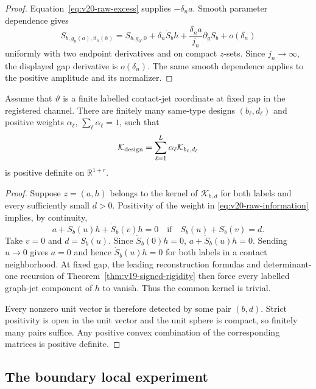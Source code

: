 \begin{proof}
Equation~\eqref{eq:v20-raw-excess} supplies $-\delta_na$.  Smooth parameter
dependence gives
\[
 S_{b,g_n(a),\vartheta_n(h)}
 =S_{b,g_0,0}+\delta_n\dot S_bh
 +\frac{\delta_na}{j_n}\partial_gS_b+o(\delta_n)
\]
uniformly with two endpoint derivatives and on compact $z$-sets.  Since
$j_n\to\infty$, the displayed gap derivative is $o(\delta_n)$.  The same
smooth dependence applies to the positive amplitude and its normalizer.
\end{proof}

\begin{lemma}
\label{lem:v20-finite-positive-design}
Assume that $\vartheta$ is a finite labelled contact-jet coordinate at fixed
gap in the registered channel.  There are finitely many same-type designs
$(b_\ell,d_\ell)$ and positive weights $\alpha_\ell$,
$\sum_\ell\alpha_\ell=1$, such that
\begin{equation}\label{eq:v20-design-info}
 \mathcal K_{\rm design}
 =\sum_{\ell=1}^L\alpha_\ell\mathcal K_{b_\ell,d_\ell}
\end{equation}
is positive definite on $\mathbb R^{1+r}$.
\end{lemma}

\begin{proof}
Suppose $z=(a,h)$ belongs to the kernel of $\mathcal K_{b,d}$ for both labels
and every sufficiently small $d>0$.  Positivity of the weight in
\eqref{eq:v20-raw-information} implies, by continuity,
\begin{equation}\label{eq:v20-kernel-level}
 a+\dot S_b(u)h+\dot S_b(v)h=0
 \quad\text{if}\quad S_b(u)+S_b(v)=d.
\end{equation}
Take $v=0$ and $d=S_b(u)$.  Since $\dot S_b(0)h=0$,
$a+\dot S_b(u)h=0$.  Sending $u\to0$ gives $a=0$ and hence
$\dot S_b(u)h=0$ for both labels in a contact neighborhood.  At fixed gap,
the leading reconstruction formulas and determinant-one recursion of
Theorem~\ref{thm:v19-signed-rigidity} then force every labelled graph-jet
component of $h$ to vanish.  Thus the common kernel is trivial.

Every nonzero unit vector is therefore detected by some pair $(b,d)$.
Strict positivity is open in the unit vector and the unit sphere is compact,
so finitely many pairs suffice.  Any positive convex combination of the
corresponding matrices is positive definite.
\end{proof}

\subsection{The boundary local experiment}

